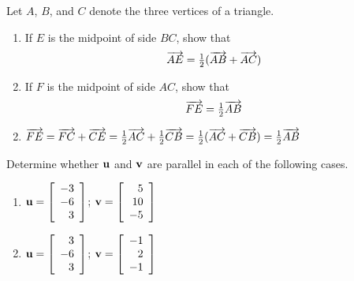 \begin{multicols}{2}
\begin{ex}
Let $A$, $B$, and $C$ denote the three vertices of a triangle.


\begin{enumerate}[label={\alph*.}]
\item If $E$ is the midpoint of side $BC$, show that
\begin{equation*}
\overrightarrow{AE} = \tfrac{1}{2}(\overrightarrow{AB} + \overrightarrow{AC})
\end{equation*}
\item If $F$ is the midpoint of side $AC$, show that
\begin{equation*}
\overrightarrow{FE} = \tfrac{1}{2}\overrightarrow{AB}
\end{equation*}
\end{enumerate}
\begin{sol}
\begin{enumerate}[label={\alph*.}]
\setcounter{enumi}{1}
\item 
$\overrightarrow{FE} = \overrightarrow{FC} + \overrightarrow{CE} = \tfrac{1}{2}\overrightarrow{AC} + \tfrac{1}{2}\overrightarrow{CB} = \tfrac{1}{2}(\overrightarrow{AC} + \overrightarrow{CB}) = \tfrac{1}{2}\overrightarrow{AB}$ 

\end{enumerate}
\end{sol}
\end{ex}

\begin{ex}
Determine whether $\textbf{u}$ and $\textbf{v}$ are parallel in each of the following cases.

\begin{enumerate}[label={\alph*.}]
\item 
$\textbf{u} = \left[
\begin{array}{r}
-3\\
-6\\
3
\end{array}
\right]$;  
$\textbf{v} = \left[
\begin{array}{r}
5\\
10 \\
-5
\end{array}
\right]$

\item 
$\textbf{u} = \left[
\begin{array}{r}
3\\
-6\\
3
\end{array}
\right]$;
$\textbf{v} = \left[
\begin{array}{r}
-1\\
2 \\
-1
\end{array}
\right]$



\end{enumerate}
\end{ex}
\end{multicols}
